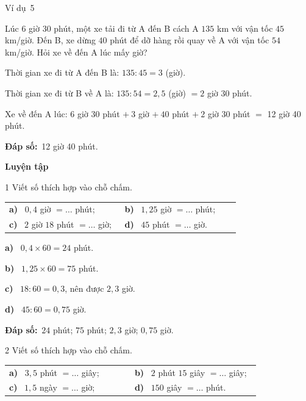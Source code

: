 \documentclass[11pt]{article}
\makeatletter
\newif\ifsol \solfalse
\renewcommand{\arraystretch}{1.35}
\providecommand{\AnsWord}{Đáp số}
\newcommand{\dapso}[1]{\par\textbf{\AnsWord:}\ #1}
\newcommand{\guide}{\par\vspace{4pt}{\bfseries\color{tmBlue}\GuideWord}\par\vspace{3pt}\nopagebreak}
\newcommand{\probsol}[1]{%
  \begin{lrbox}{\solmeasure}\begin{minipage}{\dimexpr\linewidth-24pt\relax}#1\end{minipage}\end{lrbox}%
  \ifsol
    \begin{solbox}#1\end{solbox}%
  \else
    \setlength{\solht}{\dimexpr\ht\solmeasure+\dp\solmeasure+0.85cm\relax}%
    \ifdim\solht<1.35cm\setlength{\solht}{1.35cm}\fi
    \begin{tcolorbox}[colback=white,colframe=Line,boxrule=0.8pt,arc=5pt,
      left=8pt,right=8pt,top=4pt,bottom=4pt,height=\solht]{\footnotesize\color{Slate}\itshape\WorkWord}\end{tcolorbox}%
  \fi}
\newcommand{\dividerbar}[1]{\par\vspace{0.6em}\noindent
  \begin{tcolorbox}[enhanced,frame hidden,interior hidden,borderline west={5pt}{0pt}{ProbBlue},
    colback=white,left=12pt,right=12pt,top=5pt,bottom=5pt,arc=4pt]
  {\large\bfseries\color{ProbBlue} #1}\end{tcolorbox}\vspace{0.4em}}
\newcommand{\pa}[1]{\textbf{#1)}\ }
\newenvironment{cols2}{\par\vspace{3pt}\noindent\setlength{\tabcolsep}{0pt}\renewcommand{\arraystretch}{1.3}%
  \begin{tabular}{@{}>{\raggedright\arraybackslash\rule{0pt}{4.4ex}}p{0.48\linewidth}<{\rule[-2.3ex]{0pt}{0pt}}@{\hspace{0.03\linewidth}}>{\raggedright\arraybackslash\rule{0pt}{4.4ex}}p{0.48\linewidth}<{\rule[-2.3ex]{0pt}{0pt}}@{}}}%
  {\end{tabular}\par}
\newcommand{\gap}{\vspace{0.3cm}}
\def\GuideWord{Hướng dẫn giải.}
\def\WorkWord{Bài làm:}
\def\AnsWord{Đáp số}
\def\ExWord{Ví dụ}
\makeatother
\begin{document}
\begin{exbox}{\ExWord\ 5}
\begin{minipage}[t]{0.56\linewidth}
Lúc 6 giờ 30 phút, một xe tải đi từ A đến B cách A $135$ km với vận tốc $45$ km/giờ. Đến B, xe dừng $40$ phút để dỡ hàng rồi quay về A với vận tốc $54$ km/giờ. Hỏi xe về đến A lúc mấy giờ?
\end{minipage}\hfill
\begin{minipage}[t]{0.4\linewidth}\vspace{2pt}\centering
{}
\end{minipage}
\guide
Thời gian xe đi từ A đến B là: $135:45=3$ (giờ).\par
Thời gian xe đi từ B về A là: $135:54=2{,}5$ (giờ) $=2$ giờ $30$ phút.\par
Xe về đến A lúc: 6 giờ 30 phút $+\ 3$ giờ $+\ 40$ phút $+\ 2$ giờ $30$ phút $=$ 12 giờ 40 phút.
\dapso{12 giờ 40 phút.}
\end{exbox}
\dividerbar{Luyện tập}
\begin{probbox}{1}{\relax}
Viết số thích hợp vào chỗ chấm.
\begin{cols2}
\pa{a} $0{,}4$ giờ $=\dots$ phút; & \pa{b} $1{,}25$ giờ $=\dots$ phút;\\
\pa{c} $2$ giờ $18$ phút $=\dots$ giờ; & \pa{d} $45$ phút $=\dots$ giờ.
\end{cols2}
\end{probbox}
\probsol{
\pa{a} $0{,}4\times60=24$ phút.\par \pa{b} $1{,}25\times60=75$ phút.\par \pa{c} $18:60=0{,}3$, nên được $2{,}3$ giờ.\par \pa{d} $45:60=0{,}75$ giờ.
\dapso{$24$ phút; $75$ phút; $2{,}3$ giờ; $0{,}75$ giờ.}}
\gap
\begin{probbox}{2}{\relax}
Viết số thích hợp vào chỗ chấm.
\begin{cols2}
\pa{a} $3{,}5$ phút $=\dots$ giây; & \pa{b} $2$ phút $15$ giây $=\dots$ giây;\\
\pa{c} $1{,}5$ ngày $=\dots$ giờ; & \pa{d} $150$ giây $=\dots$ phút.
\end{cols2}
\end{probbox}
\end{document}
